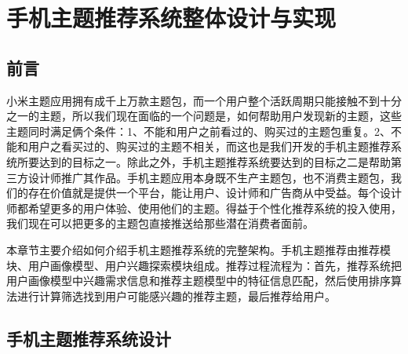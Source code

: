 
\chapter{手机主题推荐系统整体设计与实现}
    \section{前言}
    小米主题应用拥有成千上万款主题包，而一个用户整个活跃周期只能接触不到十分之一的主题，所以我们现在面临的一个问题是，如何帮助用户发现新的主题，这些主题同时满足俩个条件：1、不能和用户之前看过的、购买过的主题包重复。2、不能和用户之看买过的、购买过的主题不相关，而这也是我们开发的手机主题推荐系统所要达到的目标之一。除此之外，手机主题推荐系统要达到的目标之二是帮助第三方设计师推广其作品。手机主题应用本身既不生产主题包，也不消费主题包，我们的存在价值就是提供一个平台，能让用户、设计师和广告商从中受益。每个设计师都希望更多的用户体验、使用他们的主题。得益于个性化推荐系统的投入使用，我们现在可以把更多的主题包直接推送给那些潜在消费者面前。

    本章节主要介绍如何介绍手机主题推荐系统的完整架构。手机主题推荐由推荐模块、用户画像模型、用户兴趣探索模块组成。推荐过程流程为：首先，推荐系统把用户画像模型中兴趣需求信息和推荐主题模型中的特征信息匹配，然后使用排序算法进行计算筛选找到用户可能感兴趣的推荐主题，最后推荐给用户。
    \section{手机主题推荐系统设计}
    
    \begin{figure}
      \centering
        \label{pic:construct}
    \end{figure}

